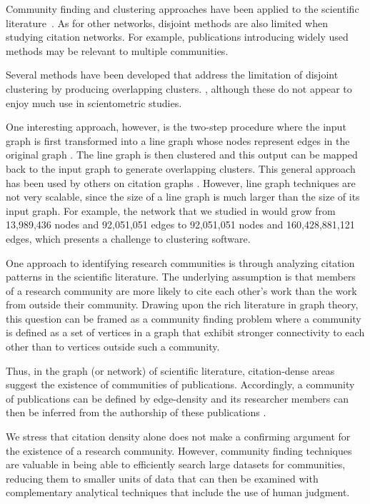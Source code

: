 \documentclass[12pt, oneside]{article}   	%
\begin{document}
Community finding and clustering approaches have been applied to the scientific literature~\citep{Newman2006,Fortunato2009,Boyack2010,Boyack2019,Traag2019,Ahlgren2020,Chandrasekharan2021,Wedell2022}. As for other networks, disjoint methods are also limited when studying citation networks.  For example, publications introducing widely used methods may be relevant to multiple communities.

Several methods have been developed that address the limitation of disjoint clustering by producing overlapping clusters. \citep{Baumes2005,Palla2005,banerjee2005model,Cleuziou2008,Lancichinetti2009,Lu2012,yang2013overlapping}, although these do not appear to enjoy much use in scientometric studies. 

One interesting approach, however, is the two-step procedure where the input graph is first transformed into a line graph whose nodes represent edges in the original graph \citep{Harary1960}.  The line graph is then clustered and this output can be mapped back to the input graph to generate overlapping clusters. This general approach has been used by others on citation graphs \citep{Evans2009,Havemann2021}. However, line graph  techniques are not very scalable, since the size of a line graph is much larger than the size of its input graph. For example, the network that we studied in \cite{Wedell2022} would grow from 13,989,436 nodes and 92,051,051 edges to 92,051,051 nodes and 160,428,881,121 edges, which presents a challenge to clustering software. 
 

One approach to identifying research communities is through analyzing citation patterns in the scientific literature. The underlying assumption is that members of a research community are more likely to cite each other's work than the work from outside their community. Drawing upon the rich literature in graph theory, this question can be framed as a community finding problem where a community is defined as a set of vertices in a graph that exhibit stronger connectivity to each other than to vertices outside such a community. 

Thus, in the graph (or network) of scientific literature, citation-dense areas suggest the existence of communities of publications. Accordingly, a community of publications can be defined by edge-density and 
its researcher members can then be inferred from the authorship of these publications \citep{Chandrasekharan2021,Wedell2022}. 
	
We stress that citation density alone does not make a confirming argument for the existence of a research community. However, community finding techniques are valuable in being able to efficiently search large datasets for communities, reducing them to smaller units of data that can then be examined with complementary analytical techniques that include the use of human judgment. 
	
\end{document}
